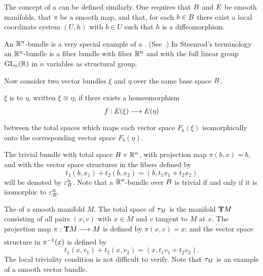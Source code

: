 \documentclass[../main]{subfiles}
\begin{document}
The concept of a  can be defined similarly. One requires that $B$ and $E$ be smooth manifolds, that $\pi$ be a smooth map, and that, for each $b\in B$ there exist a local coordinate system $(U, h)$ with $b \in U$ such that $h$ is a diffeomorphism.


\begin{remark*}
An $\mathbb R^n$-bundle is a very special example of a .
(See \cite{steenrod1951}.) In Steenrod's terminology an $\mathbb R^n$-bundle is a
fiber bundle with fiber $\mathbb R^n$ and with the full linear group $\operatorname{GL}_n(\mathbb R)$ in $n$
variables as structural group.
\end{remark*}


Now consider two vector bundles $\xi$ and $\eta$ over the same base space $B$.


\begin{definition}\label{def:02.02}
$\xi$ is  to $\eta$, written $\xi \cong \eta$, if there exists
a homeomorphism \[f:\total(\xi)\varrightarrow{}\total(\eta)\] between the total spaces which maps each vector space $F_b(\xi)$ isomorphically onto the corresponding vector space $F_b(\eta)$.
\end{definition}


\begin{example}\label{ex:02.01}
The trivial bundle with total space $B \times \mathbb R^n$, with 
projection map $\pi(b, x) = b$, and with the vector space structures in the fibers defined by
\[t_1(b,x_1) + t_2(b,x_2) = (b,t_1x_1 + t_2x_2)\]
will be denoted by $\varepsilon^n_{B}$. Note that a $\mathbb R^n$-bundle over ${B}$ is trivial
if and only if it is isomorphic to $\varepsilon^n_{{B}}$.
\end{example}


\begin{example}\label{ex:02.02}
The 
 of a smooth manifold $M$. The
total space of $\tau_{M}$ is the manifold $\mathbf{T}M$ consisting of all pairs $(x,v)$ with
$x \in M$ and $v$ tangent to $M$ at $x$. The projection map $\pi:\tangentTS M \varrightarrow{} M$
is defined by $\pi(x, v) = x$; and the vector space structure in $\pi^{-1}(x)$ is defined by
\[t_1(x,v_1) + t_2(x,v_2) = (x,t_1v_1 + t_2v_2). \]
The local triviality condition is not difficult to verify. Note that $\tau_{M}$ is
an example of a smooth vector bundle.
\end{example}
\end{document}
